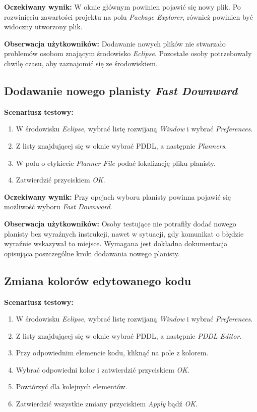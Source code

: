 \textbf{Oczekiwany wynik:} W oknie głównym powinien pojawić się nowy plik. Po rozwinięciu zawartości projektu na polu \textit{Package Explorer}, również powinien być widoczny utworzony plik.

\textbf{Obserwacja użytkowników:} Dodawanie nowych plików nie stwarzało problemów osobom znającym środowisko \textit{Eclipse}. Pozostałe osoby potrzebowały chwilę czasu, aby zaznajomić się ze środowiskiem.  

\subsection{Dodawanie nowego planisty \textit{Fast Downward}}
\textbf{Scenariusz testowy:}
  \begin{enumerate}
  
\item W środowisku \textit{Eclipse}, wybrać listę rozwijaną \textit{Window} i wybrać \textit{Preferences}.
\item Z listy znajdującej się w oknie wybrać PDDL, a następnie \textit{Planners}.
\item W polu o etykiecie \textit{Planner File} podać lokalizację pliku planisty.
\item Zatwierdzić przyciskiem \textit{OK}.
\end{enumerate}

\textbf{Oczekiwany wynik:} Przy opcjach wyboru planisty powinna pojawić się możliwość wyboru \textit{Fast Downward}.

\textbf{Obserwacja użytkowników:} Osoby testujące nie potrafiły dodać nowego planisty bez wyraźnych instrukcji, nawet w sytuacji, gdy komunikat o błędzie wyraźnie wskazywał to miejsce. Wymagana jest dokładna dokumentacja opisująca poszczególne kroki dodawania nowego planisty. 
\subsection{Zmiana kolorów edytowanego kodu}
\textbf{Scenariusz testowy:}
  \begin{enumerate}
  
\item W środowisku \textit{Eclipse}, wybrać listę rozwijaną \textit{Window} i wybrać \textit{Preferences}.
\item Z listy znajdującej się w oknie wybrać PDDL, a następnie \textit{PDDL Editor}.
\item Przy odpowiednim elemencie kodu, kliknąć na pole z kolorem.
\item Wybrać odpowiedni kolor i zatwierdzić przyciskiem \textit{OK}.
\item Powtórzyć dla kolejnych elementów.
\item Zatwierdzić wszystkie zmiany przyciskiem \textit{Apply} bądź \textit{OK}.

\end{enumerate}

